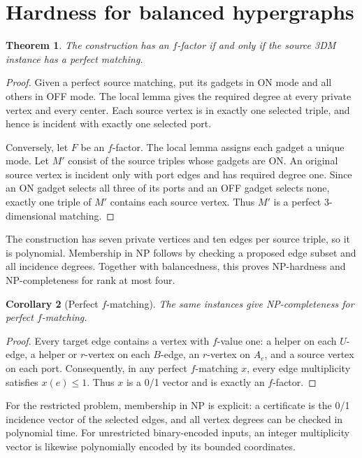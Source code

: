 \documentclass[11pt]{article}
\newtheorem{theorem}{Theorem}[section]
\newtheorem{corollary}[theorem]{Corollary}
\theoremstyle{definition}
\theoremstyle{remark}
\begin{document}
\section{Hardness for balanced hypergraphs}

\begin{theorem}
The construction has an $f$-factor if and only if the source 3DM instance
has a perfect matching.
\end{theorem}

\begin{proof}
Given a perfect source matching, put its gadgets in ON mode and all others
in OFF mode. The local lemma gives the required degree at every private
vertex and every center. Each source vertex is in exactly one selected
triple, and hence is incident with exactly one selected port.

Conversely, let $F$ be an $f$-factor. The local lemma assigns each gadget a
unique mode. Let $M'$ consist of the source triples whose gadgets are ON.
An original source vertex is incident only with port edges and has required
degree one. Since an ON gadget selects all three of its ports and an OFF
gadget selects none, exactly one triple of $M'$ contains each source vertex.
Thus $M'$ is a perfect 3-dimensional matching.
\end{proof}

The construction has seven private vertices and ten edges per source triple,
so it is polynomial. Membership in NP follows by checking a proposed edge
subset and all incidence degrees. Together with balancedness, this proves
NP-hardness and NP-completeness for rank at most four.

\begin{corollary}[Perfect $f$-matching]
The same instances give NP-completeness for perfect $f$-matching.
\end{corollary}

\begin{proof}
Every target edge contains a vertex with $f$-value one: a helper on each
$U$-edge, a helper or $r$-vertex on each $B$-edge, an $r$-vertex on $A_e$,
and a source vertex on each port. Consequently, in any perfect $f$-matching
$x$, every edge multiplicity satisfies $x(e)\le1$. Thus $x$ is a 0/1
vector and is exactly an $f$-factor.
\end{proof}

\noindent
For the restricted problem, membership in NP is explicit: a certificate is
the 0/1 incidence vector of the selected edges, and all vertex degrees can be
checked in polynomial time. For unrestricted binary-encoded inputs, an
integer multiplicity vector is likewise polynomially encoded by its bounded
coordinates.
\end{document}
